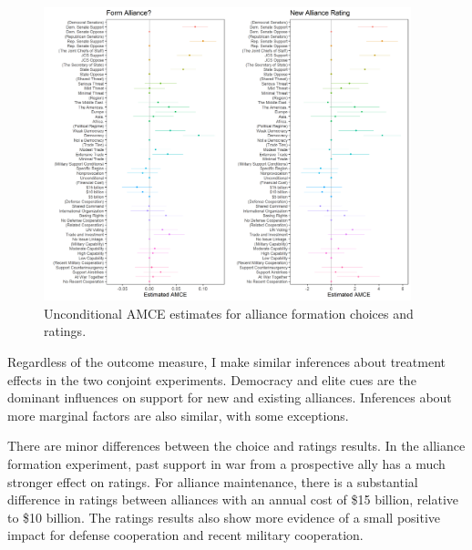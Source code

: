 \documentclass[12pt]{article}
\begin{document}
\begin{figure}
	\centering
		\includegraphics[width=0.95\textwidth]{formation-plots.png}
	\caption{Unconditional AMCE estimates for alliance formation choices and ratings.}
	\label{fig:formation-plots}
\end{figure}


Regardless of the outcome measure, I make similar inferences about treatment effects in the two conjoint experiments. 
Democracy and elite cues are the dominant influences on support for new and existing alliances. 
Inferences about more marginal factors are also similar, with some exceptions. 


There are minor differences between the choice and ratings results. 
In the alliance formation experiment, past support in war from a prospective ally has a much stronger effect on ratings. 
For alliance maintenance, there is a substantial difference in ratings between alliances with an annual cost of \$15 billion, relative to \$10 billion. 
The ratings results also show more evidence of a small positive impact for defense cooperation and recent military cooperation. 
\end{document}
